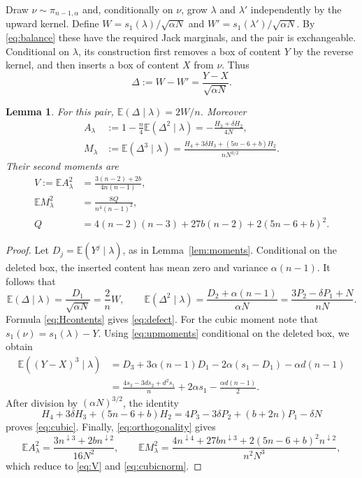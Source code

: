 \documentclass[11pt]{article}
\newtheorem{lemma}[theorem]{Lemma}
\newcommand{\E}{\mathbb E}
\newcommand{\fall}[2]{#1^{\downarrow #2}}
\begin{document}
Draw $\nu\sim\pi_{n-1,\alpha}$ and, conditionally on $\nu$, grow
$\lambda$ and $\lambda'$ independently by the upward kernel. Define
$W=s_1(\lambda)/\sqrt{\alpha N}$ and
$W'=s_1(\lambda')/\sqrt{\alpha N}$. By \eqref{eq:balance} these have the
required Jack marginals, and the pair is exchangeable. Conditional on
$\lambda$, its construction first removes a box of content $Y$ by the
reverse kernel, and then inserts a box of content $X$ from $\nu$.
Thus
\[
 \Delta:=W-W'=\frac{Y-X}{\sqrt{\alpha N}}.
\]

\begin{lemma}\label{lem:pair}
For this pair, $\E(\Delta\mid\lambda)=2W/n$. Moreover
\begin{align}
 A_\lambda&:=1-\frac n4\E(\Delta^2\mid\lambda)
                  =-\frac{H_3+\delta H_2}{4N},\label{eq:defect}\\
 M_\lambda&:=\E(\Delta^3\mid\lambda)
       =\frac{H_4+3\delta H_3+(5n-6+b)H_2}{nN^{3/2}}.\label{eq:cubic}
\end{align}
Their second moments are
\begin{align}
 V:=\E A_\lambda^2&=\frac{3(n-2)+2b}{4n(n-1)},\label{eq:V}\\
 \E M_\lambda^2&=\frac{8Q}{n^4(n-1)^2},\label{eq:cubicnorm}\\
 Q&=4(n-2)(n-3)+27b(n-2)+2(5n-6+b)^2.\label{eq:Q}
\end{align}
\end{lemma}

\begin{proof}
Let $D_j=\E(Y^j\mid\lambda)$, as in Lemma~\ref{lem:moments}.
Conditional on the deleted box, the inserted content has mean zero and
variance $\alpha(n-1)$.
It follows that
\[
 \E(\Delta\mid\lambda)=\frac{D_1}{\sqrt{\alpha N}}=\frac2n W,
 \qquad
 \E(\Delta^2\mid\lambda)=\frac{D_2+\alpha(n-1)}{\alpha N}
                        =\frac{3P_2-\delta P_1+N}{nN}.
\]
Formula \eqref{eq:Hcontents} gives \eqref{eq:defect}.
For the cubic moment note that $s_1(\nu)=s_1(\lambda)-Y$.
Using \eqref{eq:upmoments} conditional on the deleted box, we obtain
\begin{align*}
 \E((Y-X)^3\mid\lambda)
 &=D_3+3\alpha(n-1)D_1-2\alpha(s_1-D_1)-\alpha d(n-1)\\
 &=\frac{4s_3-3ds_2+d^2s_1}{n}+2\alpha s_1-\frac{\alpha d(n-1)}2.
\end{align*}
After division by $(\alpha N)^{3/2}$, the identity
\[
 H_4+3\delta H_3+(5n-6+b)H_2
       =4P_3-3\delta P_2+(b+2n)P_1-\delta N
\]
proves \eqref{eq:cubic}. Finally, \eqref{eq:orthogonality} gives
\[
 \E A_\lambda^2=\frac{3\fall n3+2b\fall n2}{16N^2},\qquad
 \E M_\lambda^2=
 \frac{4\fall n4+27b\fall n3+2(5n-6+b)^2\fall n2}{n^2N^3},
\]
which reduce to \eqref{eq:V} and \eqref{eq:cubicnorm}.
\end{proof}
\end{document}
